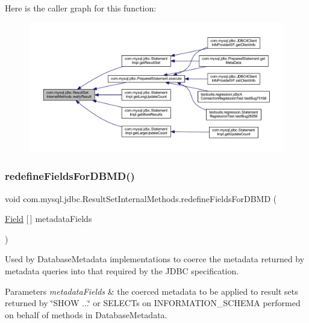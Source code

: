Here is the caller graph for this function\+:
\nopagebreak
\begin{figure}[H]
\begin{center}
\leavevmode
\includegraphics[width=350pt]{interfacecom_1_1mysql_1_1jdbc_1_1_result_set_internal_methods_a3e6296e287a3c596e1d63ca2d8fe9fc5_icgraph}
\end{center}
\end{figure}
\mbox{\label{interfacecom_1_1mysql_1_1jdbc_1_1_result_set_internal_methods_a1d2bda162ae25d5209f62788938d2737}} 
\subsubsection{\texorpdfstring{redefine\+Fields\+For\+D\+B\+M\+D()}{redefineFieldsForDBMD()}}
{\footnotesize\ttfamily void com.\+mysql.\+jdbc.\+Result\+Set\+Internal\+Methods.\+redefine\+Fields\+For\+D\+B\+MD (\begin{DoxyParamCaption}\item[{\mbox{\hyperlink{classcom_1_1mysql_1_1jdbc_1_1_field}{Field}} \mbox{[}$\,$\mbox{]}}]{metadata\+Fields }\end{DoxyParamCaption})}

Used by Database\+Metadata implementations to coerce the metadata returned by metadata queries into that required by the J\+D\+BC specification.


\begin{DoxyParams}{Parameters}
{\em metadata\+Fields} & the coerced metadata to be applied to result sets returned by \char`\"{}\+S\+H\+O\+W ...\char`\"{} or S\+E\+L\+E\+C\+Ts on I\+N\+F\+O\+R\+M\+A\+T\+I\+O\+N\+\_\+\+S\+C\+H\+E\+MA performed on behalf of methods in Database\+Metadata. \\
\hline
\end{DoxyParams}


